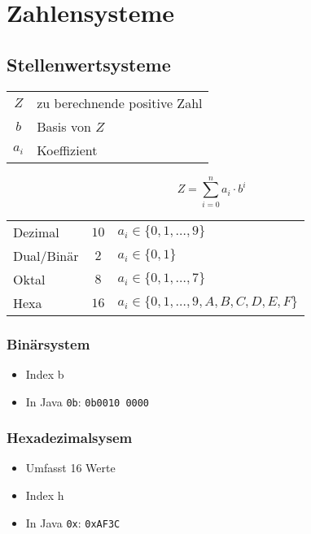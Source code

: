 \section{Zahlensysteme}
\subsection{Stellenwertsysteme}
\begin{center}
    \begin{minipage}{0.65\linewidth}
        \begin{center}
            \begin{tabular}{c l}
                $Z$ & zu berechnende positive Zahl\\
                $b$ & Basis von $Z$\\
                $a_i$ & Koeffizient
            \end{tabular}
        \end{center}
    \end{minipage}
    \hfill
    \begin{minipage}{0.3\linewidth}
        \begin{equation*}
            Z = \sum_{i=0}^{n} a_i \cdot b^i
        \end{equation*}
    \end{minipage}
\end{center}
\begin{flushleft}
    \begin{tabular}{l c l}
        Dezimal & $10$ & $a_i \in \{0, 1, \dots, 9\}$\\
        Dual/Binär & $2$ & $a_i \in \{0, 1\}$\\
        Oktal & $8$ & $a_i \in \{0, 1, \dots, 7\}$\\
        Hexa & $16$ & $a_i \in \{0, 1, \dots, 9, A, B, C, D, E, F\}$\\
    \end{tabular}
\end{flushleft}
\begin{minipage}{0.3\linewidth}
	\subsubsection{Binärsystem}
	\begin{itemize}
		\item Index b
		\item In Java \texttt{0b}: \texttt{0b0010 0000}
	\end{itemize}
\end{minipage}
\hfill
\begin{minipage}{0.5\linewidth}
	\subsubsection{Hexadezimalsysem}
	\begin{itemize}
		\item Umfasst 16 Werte
		\item Index h
		\item In Java \texttt{0x}: \texttt{0xAF3C}
	\end{itemize}
\end{minipage}
